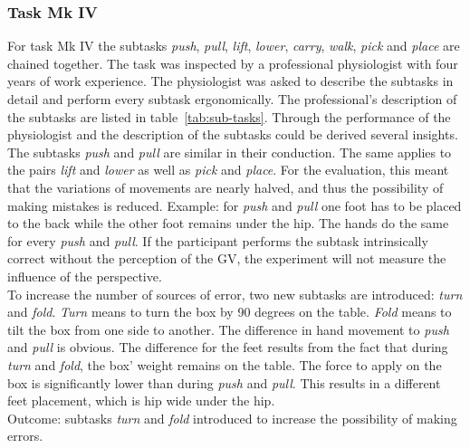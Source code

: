 \subsubsection{Task Mk IV}
For task Mk IV the subtasks \textit{push}, \textit{pull}, \textit{lift}, \textit{lower}, \textit{carry}, \textit{walk}, \textit{pick} and \textit{place} are chained together. The task was inspected by a professional physiologist with four years of work experience. The physiologist was asked to describe the subtasks in detail and perform every subtask ergonomically. The professional's description of the subtasks are listed in table~\ref{tab:sub-tasks}. Through the performance of the physiologist and the description of the subtasks could be derived several insights. The subtasks \textit{push} and \textit{pull} are similar in their conduction. The same applies to the pairs \textit{lift} and \textit{lower} as well as \textit{pick} and \textit{place}. For the evaluation, this meant that the variations of movements are nearly halved, and thus the possibility of making mistakes is reduced. Example: for \textit{push} and \textit{pull} one foot has to be placed to the back while the other foot remains under the hip. The hands do the same for every \textit{push} and \textit{pull}. If the participant performs the subtask intrinsically correct without the perception of the GV, the experiment will not measure the influence of the perspective.\\
To increase the number of sources of error, two new subtasks are introduced: \textit{turn} and \textit{fold}. \textit{Turn} means to turn the box by 90 degrees on the table. \textit{Fold} means to tilt the box from one side to another. The difference in hand movement to \textit{push} and \textit{pull} is obvious. The difference for the feet results from the fact that during \textit{turn} and \textit{fold}, the box' weight remains on the table. The force to apply on the box is significantly lower than during \textit{push} and \textit{pull}. This results in a different feet placement, which is hip wide under the hip.\\
Outcome: subtasks \textit{turn} and \textit{fold} introduced to increase the possibility of making errors.

